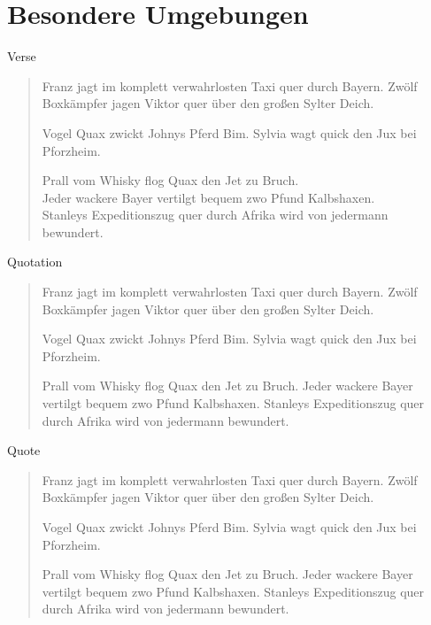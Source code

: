	\section{Besondere Umgebungen}

	\begin{frame}{Verse}
		\begin{verse}
			Franz jagt im komplett verwahrlosten Taxi quer durch Bayern.
			Zwölf Boxkämpfer jagen Viktor quer über den großen Sylter Deich.

			Vogel Quax zwickt Johnys Pferd Bim.
			Sylvia wagt quick den Jux bei Pforzheim.

			Prall vom Whisky flog Quax den Jet zu Bruch.\\
			Jeder wackere Bayer vertilgt bequem zwo Pfund Kalbshaxen.\\
			Stanleys Expeditionszug quer durch Afrika wird von jedermann bewundert.\\
		\end{verse}
	\end{frame}


	\begin{frame}{Quotation}
		\begin{quotation}
			Franz jagt im komplett verwahrlosten Taxi quer durch Bayern.
			Zwölf Boxkämpfer jagen Viktor quer über den großen Sylter Deich.

			Vogel Quax zwickt Johnys Pferd Bim.
			Sylvia wagt quick den Jux bei Pforzheim.

			Prall vom Whisky flog Quax den Jet zu Bruch.
			Jeder wackere Bayer vertilgt bequem zwo Pfund Kalbshaxen.
			Stanleys Expeditionszug quer durch Afrika wird von jedermann bewundert.
		\end{quotation}
	\end{frame}


	\begin{frame}{Quote}
		\begin{quote}
			Franz jagt im komplett verwahrlosten Taxi quer durch Bayern.
			Zwölf Boxkämpfer jagen Viktor quer über den großen Sylter Deich.

			Vogel Quax zwickt Johnys Pferd Bim.
			Sylvia wagt quick den Jux bei Pforzheim.

			Prall vom Whisky flog Quax den Jet zu Bruch.
			Jeder wackere Bayer vertilgt bequem zwo Pfund Kalbshaxen.
			Stanleys Expeditionszug quer durch Afrika wird von jedermann bewundert.
		\end{quote}
	\end{frame}


